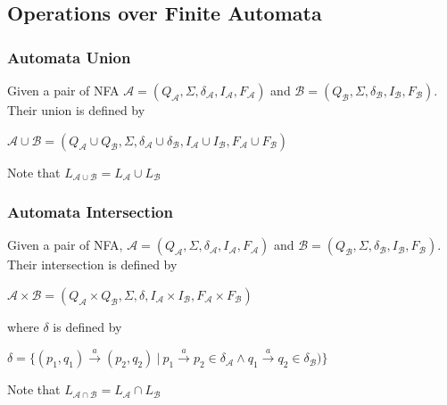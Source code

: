   \subsection{Operations over Finite Automata}
    \label{defAOps}
    \subsubsection{Automata Union}
    \label{defAUnion}
      Given a pair of NFA $\mathcal{A}=(Q_\mathcal{A},\Sigma,\delta_\mathcal{A},I_\mathcal{A},F_\mathcal{A})$ 
      and $\mathcal{B}=(Q_\mathcal{B},\Sigma,\delta_\mathcal{B},I_\mathcal{B},F_\mathcal{B})$. Their union is defined by
      \begin{description}
        \item $\mathcal{A} \cup \mathcal{B}=(Q_\mathcal{A}\cup Q_\mathcal{B},\Sigma,
            \delta_\mathcal{A}\cup\delta_\mathcal{B},I_\mathcal{A}\cup I_\mathcal{B},F_\mathcal{A}\cup F_\mathcal{B})$
      \end{description}
      Note that $L_{\mathcal{A}\cup\mathcal{B}}=L_\mathcal{A}\cup L_\mathcal{B}$
    
    \subsubsection{Automata Intersection}
    \label{defAInter}
      Given a pair of NFA, $\mathcal{A}=(Q_\mathcal{A},\Sigma,\delta_\mathcal{A},I_\mathcal{A},F_\mathcal{A})$ 
      and $\mathcal{B}=(Q_\mathcal{B},\Sigma,\delta_\mathcal{B},I_\mathcal{B},F_\mathcal{B})$. Their intersection is defined by
      \begin{description}
        \item $\mathcal{A} \times \mathcal{B}=(Q_\mathcal{A}\times Q_\mathcal{B},\Sigma,\delta,I_\mathcal{A}\times I_\mathcal{B},F_\mathcal{A}
          \times F_\mathcal{B})$\
      \end{description}
      where $\delta$ is defined by
      \begin{description}
        \item $\delta = 
        \{(p_1,q_1) \xrightarrow{a} (p_2,q_2)\ |\ p_1 \xrightarrow{a} p_2 \in \delta_\mathcal{A} \wedge q_1 \xrightarrow{a} q_2 \in \delta_\mathcal{B})\}$\
      \end{description}
      Note that $L_{\mathcal{A}\cap\mathcal{B}}=L_\mathcal{A}\cap L_\mathcal{B}$

